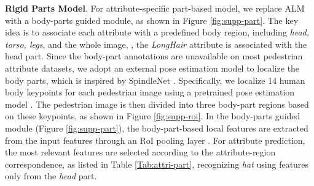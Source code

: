 \documentclass[10pt,twocolumn,letterpaper]{article}
\begin{document}
\textbf{Rigid Parts Model}. For attribute-specific part-based model, we replace ALM with a body-parts guided module, as shown in Figure \ref{fig:supp-part}.
The key idea is to associate each attribute with a predefined body region, including \textit{head, torso, legs}, and the whole image, \eg, the \textit{LongHair} attribute is associated with the head part.
Since the body-part annotations are unavailable on most pedestrian attribute datasets, we adopt an external pose estimation model to localize the body parts, which is inspired by SpindleNet \cite{Zhao_2017_CVPR}.
Specifically, we localize 14 human body keypoints for each pedestrian image using a pretrained pose estimation model \cite{Zhao_2017_CVPR}.
The pedestrian image is then divided into three body-part regions based on these keypoints, as shown in Figure \ref{fig:supp-roi}.
In the body-parts guided module (Figure \ref{fig:supp-part}), the body-part-based local features are extracted from the input features  through an RoI pooling layer \cite{girshick2015fast}.
For attribute prediction, the most relevant features are selected according to the attribute-region correspondence, as listed in Table \ref{Tab:attri-part}, \eg recognizing \textit{hat} using features only from the \textit{head} part.
\end{document}
